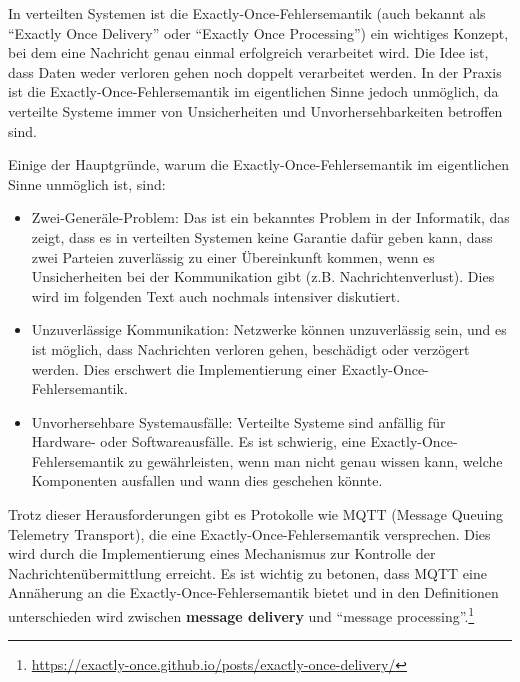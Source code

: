\documentclass[../vs-script-first-v01.tex]{subfiles}
\begin{document}
In verteilten Systemen ist die Exactly-Once-Fehlersemantik (auch bekannt als \enquote{Exactly Once Delivery} oder \enquote{Exactly Once Processing}) ein wichtiges Konzept, bei dem eine Nachricht genau einmal erfolgreich verarbeitet wird. Die Idee ist, dass Daten weder verloren gehen noch doppelt verarbeitet werden. In der Praxis ist die Exactly-Once-Fehlersemantik im eigentlichen Sinne jedoch unmöglich, da verteilte Systeme immer von Unsicherheiten und Unvorhersehbarkeiten betroffen sind.

Einige der Hauptgründe, warum die Exactly-Once-Fehlersemantik im eigentlichen Sinne unmöglich ist, sind:
\begin{itemize}
\item Zwei-Generäle-Problem: Das ist ein bekanntes Problem in der Informatik, das zeigt, dass es in verteilten Systemen keine Garantie dafür geben kann, dass zwei Parteien zuverlässig zu einer Übereinkunft kommen, wenn es Unsicherheiten bei der Kommunikation gibt (z.B. Nachrichtenverlust). Dies wird im folgenden Text auch nochmals intensiver diskutiert.
\item Unzuverlässige Kommunikation: Netzwerke können unzuverlässig sein, und es ist möglich, dass Nachrichten verloren gehen, beschädigt oder verzögert werden. Dies erschwert die Implementierung einer Exactly-Once-Fehlersemantik.
\item Unvorhersehbare Systemausfälle: Verteilte Systeme sind anfällig für Hardware- oder Softwareausfälle. Es ist schwierig, eine Exactly-Once-Fehlersemantik zu gewährleisten, wenn man nicht genau wissen kann, welche Komponenten ausfallen und wann dies geschehen könnte.
\end{itemize}
Trotz dieser Herausforderungen gibt es Protokolle wie MQTT (Message Queuing Telemetry Transport), die eine Exactly-Once-Fehlersemantik versprechen. Dies wird durch die Implementierung eines Mechanismus zur Kontrolle der Nachrichtenübermittlung erreicht. Es ist wichtig zu betonen, dass MQTT eine Annäherung an die Exactly-Once-Fehlersemantik bietet und in den Definitionen unterschieden wird zwischen  \textbf{message delivery} und \enquote{message processing}.\footnote{\url{https://exactly-once.github.io/posts/exactly-once-delivery/}}
\end{document}
